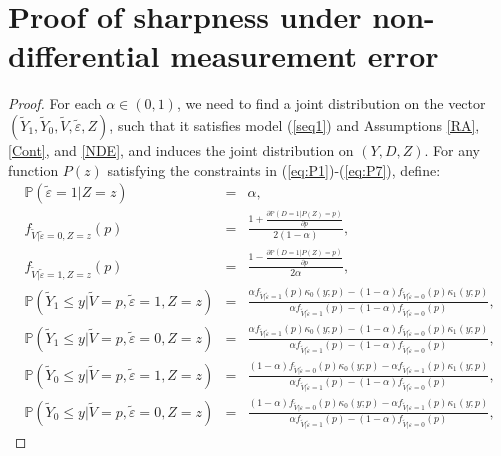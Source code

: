 \documentclass[11pt,reqno]{amsart}
\theoremstyle{plain}
\numberwithin{equation}{section}
\begin{document}
\section{Proof of sharpness under non-differential measurement error} \label{sharpnessproof}
\begin{proof}
For each $\alpha \in (0,1)$, we need to find a joint distribution on the vector $\left(\tilde{Y}_1, \tilde{Y}_0, \tilde{V}, \tilde{\varepsilon}, Z\right)$, such that it satisfies model (\ref{seq1}) and Assumptions \ref{RA}, \ref{Cont}, and \ref{NDE}, and induces the joint distribution on $(Y,D,Z)$. For any function $P(z)$ satisfying the constraints in (\ref{eq:P1})-(\ref{eq:P7}), define:  
\begin{eqnarray*}
\mathbb P(\tilde{\varepsilon}=1 \vert Z=z)&=& \alpha,\\
f_{\tilde{V}\vert \tilde{\varepsilon}=0, Z=z}(p)  &=&\frac{1+ \frac{\partial \mathbb P(D=1 \vert P(Z)=p) }{\partial p}}{2(1-\alpha)},\\
f_{\tilde{V}\vert \tilde{\varepsilon}=1, Z=z}(p)  &=&\frac{1- \frac{\partial \mathbb P(D=1 \vert P(Z)=p) }{\partial p}}{2\alpha},\\
\mathbb P(\tilde{Y}_1 \leq y \vert \tilde{V}=p,\tilde{\varepsilon}=1, Z=z) &=& \frac{\alpha f_{\tilde{V}\vert \tilde{\varepsilon}=1}(p)\kappa_0(y;p)-\left(1-\alpha\right)f_{\tilde{V}\vert \tilde{\varepsilon}=0}(p)\kappa_1(y;p)}{\alpha f_{\tilde{V}\vert \tilde{\varepsilon}=1}(p)-\left(1-\alpha\right)f_{\tilde{V}\vert \tilde{\varepsilon}=0}(p)},\\
\mathbb P(\tilde{Y}_1 \leq y \vert \tilde{V}=p,\tilde{\varepsilon}=0, Z=z) &=& \frac{\alpha f_{\tilde{V}\vert \tilde{\varepsilon}=1}(p)\kappa_0(y;p)-\left(1-\alpha\right)f_{\tilde{V}\vert \tilde{\varepsilon}=0}(p)\kappa_1(y;p)}{\alpha f_{\tilde{V}\vert \tilde{\varepsilon}=1}(p)-\left(1-\alpha\right)f_{\tilde{V}\vert \tilde{\varepsilon}=0}(p)},\\
\mathbb P(\tilde{Y}_0 \leq y \vert \tilde{V}=p,\tilde{\varepsilon}=1, Z=z) &=& \frac{\left(1-\alpha\right) f_{\tilde{V}\vert \tilde{\varepsilon}=0}(p)\kappa_0(y;p)-\alpha f_{\tilde{V}\vert \tilde{\varepsilon}=1}(p)\kappa_1(y;p)}{\alpha f_{\tilde{V}\vert \tilde{\varepsilon}=1}(p)-\left(1-\alpha\right)f_{\tilde{V}\vert \tilde{\varepsilon}=0}(p)},\\
\mathbb P(\tilde{Y}_0 \leq y \vert \tilde{V}=p,\tilde{\varepsilon}=0, Z=z) &=& \frac{\left(1-\alpha\right) f_{\tilde{V}\vert \varepsilon=0}(p)\kappa_0(y;p)-\alpha f_{\tilde{V}\vert \varepsilon=1}(p)\kappa_1(y;p)}{\alpha f_{\tilde{V}\vert \tilde{\varepsilon}=1}(p)-\left(1-\alpha\right)f_{\tilde{V}\vert \varepsilon=0}(p)},

\end{eqnarray*}
\end{proof}
\end{document}
